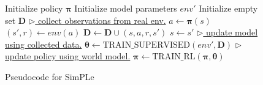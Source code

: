 \begin{figure}  %
\removelatexerror
\begin{algorithm}[H]
\caption{Pseudocode for SimPLe}\label{dpll}
\begin{algorithmic}
\STATE Initialize policy $\boldsymbol\pi$
\STATE Initialize model parameters $env'$
\STATE Initialize empty set $\mathbf{D}$
\STATE \underline{$\triangleright$ collect observations from real env.}
\STATE $a \gets \boldsymbol\pi(s)$
\STATE $(s' ,r) \gets env(a)$
\STATE $\mathbf{D} \gets \mathbf{D} \cup (s,a,r,s')$
\STATE $s \leftarrow s'$
\ENDWHILE
\STATE \underline{$\triangleright$ update model using collected data.}
\STATE $\boldsymbol\theta \gets \text{TRAIN\_SUPERVISED}(env', \mathbf{D})$
\STATE \underline{$\triangleright$ update policy using world model.}
\STATE $\boldsymbol\pi \gets \text{TRAIN\_RL}(\boldsymbol\pi, \boldsymbol\theta)$
\ENDWHILE
\end{algorithmic}
\label{basic_loop}
\label{alg:basic_loop}
\end{algorithm}
\end{figure}